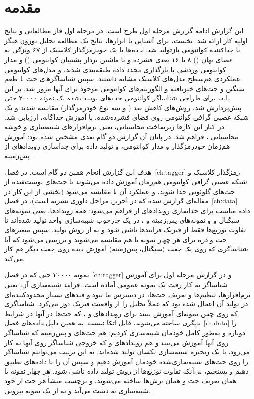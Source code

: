 \chapter*{مقدمه}
\label{ch:intro}

این گزارش ادامه گزارش مرحله اول طرح است. در مرحله اول فاز مطالعاتی و نتایج اولیه کار ارائه شد. نخست، برای آشنایی با ابزارها، نتایج یک مطالعه تحلیل بوزون هیگز با جداکننده کوانتومی بازتولید شد: داده‌ها با یک خودرمزگذار کلاسیک از ۶۷ ویژگی به فضای نهان () ۸ یا ۱۶ بعدی فشرده و با ماشین بردار پشتیبان کوانتومی () و مدار کوانتومی وردشی با بارگذاری مجدد داده طبقه‌بندی شدند، و مدل‌های کوانتومی عملکردی هم‌سطح مدل‌های کلاسیک مشابه داشتند. سپس شناساگرهای جت با طعم سنگین و جت‌های خیزبافته و الگوریتم‌های کوانتومی موجود برای آنها مرور شد. بر این پایه، برای طراحی شناساگر کوانتومی جت‌های بوست‌شده یک نمونه ۲۰۰۰۰ جتی پیش‌پردازش شد، روش‌های کاهش بعد ( و سه نوع خودرمزگذار) مقایسه شدند و یک شبکه عصبی گرافی کوانتومی روی فضای فشرده‌شده، با آموزش جداگانه، ارزیابی شد. در کنار این کارها زیرساخت محاسباتی، یعنی نرم‌افزارهای شبیه‌سازی و خوشه محاسباتی ، فراهم شد. در پایان آن گزارش دو گام بعدی مشخص شده بود: آموزش هم‌زمان خودرمزگذار و مدار کوانتومی، و تولید داده برای جداسازی رویدادهای \ttZ از پس‌زمینه \ttbb.

هدف این گزارش انجام همین دو گام است. در فصل~\ref{ch:tagger} رمزگذار کلاسیک و شبکه عصبی گرافی کوانتومی هم‌زمان آموزش داده می‌شوند تا جت‌های \Zbos{} بوست‌شده از جت‌های گلوئونی جدا شوند، و عملکرد آن با  مقایسه می‌شود (بخشی از این کار در مقاله‌ای گزارش شده که در آخرین مراحل داوری نشریه  است). در فصل~\ref{ch:data} داده مناسب برای جداسازی رویدادهای \ttZ از \ttbb فراهم می‌شود: همه رویدادها، یعنی نمونه‌های سیگنال \Zjet و \ttZ و نمونه‌های پس‌زمینه \bbbb و \ttbb، در یک چارچوب شبیه‌سازی واحد تولید شده‌اند تا تفاوت توزیع‌ها فقط از فیزیک فرایندها ناشی شود و نه از روش تولید. سپس متغیرهای جت و ذره برای هر چهار نمونه با هم مقایسه می‌شوند و بررسی می‌شود که آیا شناساگری که روی یک جفت (سیگنال، پس‌زمینه) آموزش دیده روی جفت دیگر هم کار می‌کند.

نمونه ۲۰۰۰۰ جتی که در فصل~\ref{ch:tagger} و در گزارش مرحله اول برای آموزش شناساگر به کار رفت یک نمونه عمومی آماده است. فرایند شبیه‌سازی آن، یعنی نرم‌افزارها، تنظیم‌ها و تعریف جت‌ها، در دسترس ما نبود و قیدهای بسیار محدودکننده‌ای در تولید آن اعمال شده بود که عملاً تحلیل را از واقعیت فیزیک دور می‌کرد. شناساگری که روی چنین نمونه‌ای آموزش ببیند برای رویدادهای \ttZ و \ttbb، که جت‌ها در آنها در شرایط دیگری ساخته می‌شوند، قابل اتکا نیست. به همین دلیل داده‌های فصل~\ref{ch:data} را دوباره و به‌طور کامل خودمان شبیه‌سازی کردیم: هم جت‌های \Zbos{} و پس‌زمینه \bbbb که شناساگر روی آنها آموزش می‌بیند و هم رویدادهای \ttZ و \ttbb که خروجی شناساگر روی آنها به کار می‌رود، با یک زنجیره شبیه‌سازی یکسان تولید شده‌اند. به این ترتیب می‌توانیم شناساگر \Zbos{} را روی جت‌های \Zbos{} شبیه‌سازی‌شده خودمان آموزش دهیم و سپس آن را با داده‌های \ttZ تطبیق دهیم و بسنجیم، بی‌آنکه تفاوت توزیع‌ها از روش تولید داده ناشی شود. هر چهار نمونه با همان تعریف جت و همان برش‌ها ساخته می‌شوند، و برچسب منشأ هر جت از خود شبیه‌سازی به دست می‌آید و نه از یک نمونه بیرونی.
